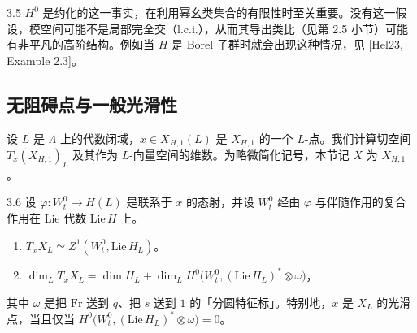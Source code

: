 \begin{rem}{3.5}
$H^0$ 是约化的这一事实，在利用幂幺类集合的有限性时至关重要。没有这一假设，模空间可能不是局部完全交（l.c.i.），从而其导出类比（见第 2.5 小节）可能有非平凡的高阶结构。例如当 $H$ 是 Borel 子群时就会出现这种情况，见 [Hel23, Example 2.3]。
\end{rem}


\subsection{无阻碍点与一般光滑性}

设 $L$ 是 $\Lambda$ 上的代数闭域，$x\in X_{H,1}(L)$ 是 $X_{H,1}$ 的一个 $L$-点。我们计算切空间 $T_x(X_{H,1})_L$ 及其作为 $L$-向量空间的维数。为略微简化记号，本节记 $X$ 为 $X_{H,1}$。

\begin{lem}{3.6}
设 $\varphi:W^0_t\to H(L)$ 是联系于 $x$ 的态射，并设 $W^0_t$ 经由 $\varphi$ 与伴随作用的复合作用在 Lie 代数 $\mathrm{Lie}\,H$ 上。
\begin{enumerate}[label=(\arabic*),leftmargin=2.6em,itemsep=0.2em]
\item $T_xX_L\simeq Z^1(W^0_t,\mathrm{Lie}\,H_L)$。
\item $\dim_L T_xX_L=\dim H_L+\dim_L H^0\bigl(W^0_t,(\mathrm{Lie}\,H_L)^*\otimes\omega\bigr)$，
\end{enumerate}
其中 $\omega$ 是把 $\mathrm{Fr}$ 送到 $q$、把 $s$ 送到 $1$ 的「分圆特征标」。特别地，$x$ 是 $X_L$ 的光滑点，当且仅当 $H^0\bigl(W^0_t,(\mathrm{Lie}\,H_L)^*\otimes\omega\bigr)=0$。
\end{lem}

